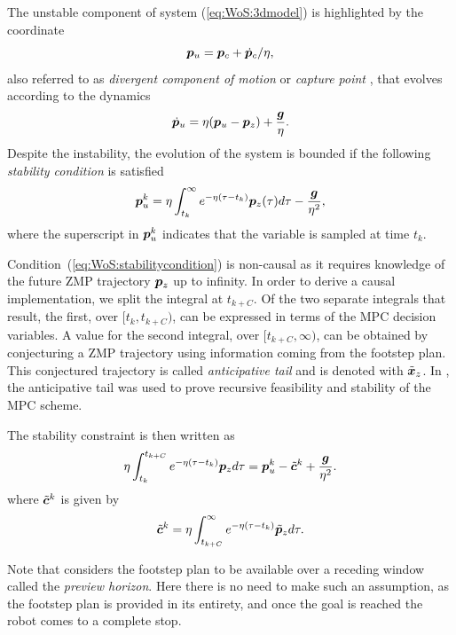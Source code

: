 The unstable component of system (\ref{eq:WoS:3dmodel}) is highlighted by the coordinate
\begin{equation*}
    {\bm{p}}_u = {\bm{p}}_c + \dot {{\bm{p}}}_c/\eta,
\end{equation*}
also referred to as \textit{divergent component of motion} \cite{Englsberger2015TRO} or \textit{capture point} \cite{Pratt2006CapturePoint}, that evolves according to the dynamics
\begin{equation}
\dot{{\bm{p}}}_u = \eta({\bm{p}}_u - {\bm{p}}_z) + \frac{{\bm{g}}}{\eta}.
\end{equation}
Despite the instability, the evolution of the system is bounded if the following \emph{stability condition} is satisfied
\begin{equation}
\label{eq:WoS:stabilitycondition}
{\bm{p}}_u^k = \eta\int_{t_k}^{\infty}e^{-\eta(\tau - t_k)}{\bm{p}}_z(\tau) d\tau - \frac{{\bm{g}}}{\eta^2},
\end{equation}
where the superscript in ${{\bm{p}}}_u^k$ indicates that the variable is sampled at time $t_k$.

Condition~(\ref{eq:WoS:stabilitycondition}) is non-causal as it requires knowledge of the future ZMP trajectory ${\bm{p}}_z$ up to infinity. In order to derive a causal implementation, we split the integral at $t_{k+C}$. Of the two separate integrals that result, the first, over $[t_k, t_{k+C})$, can be expressed in terms of the MPC decision variables. A value for the second integral, over $[t_{k+C}, \infty)$, can be obtained by conjecturing a ZMP trajectory using information coming from the footstep plan.
This conjectured trajectory is called \emph{anticipative tail} and is denoted with $\tilde {{\bm{x}}}_z$. 
In \cite{Scianca2020TRO}, the anticipative tail was used to prove recursive feasibility and stability of the MPC scheme.

The stability constraint is then written as
\begin{equation}\label{eq:WoS:stability_constraint}
\eta\int_{t_k}^{t_{k+C}}e^{-\eta(\tau - t_k)}{\bm{p}}_z d\tau = {\bm{p}}_u^k - \tilde {{\bm{c}}}^k + \frac{{\bm{g}}}{\eta^2}.
\end{equation}
where $\tilde {{\bm{c}}}^k$ is given by
\begin{equation}%
\tilde\bfc^k = \eta\int_{t_{k+C}}^{\infty}e^{-\eta(\tau - t_k)}\tilde\bfp_z d\tau.
\end{equation}

Note that \cite{Scianca2020TRO} considers the footstep plan to be available over a receding window called the \emph{preview horizon}. Here there is no need to make such an assumption, as the footstep plan is provided in its entirety, and once the goal is reached the robot comes to a complete stop.

